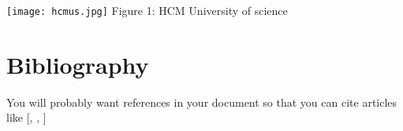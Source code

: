 \documentclass{article}
\begin{document}
\begin{center}
  \texttt{[image: hcmus.jpg]}
  Figure 1: HCM University of science
\end{center}

\section{Bibliography}
You will probably want references in your document so that you can cite articles like [\cite{frenkel_fine_2013}, \cite{frenkel_optical_2013}, \cite{frenkel_temperature_2012}]



\end{document}

